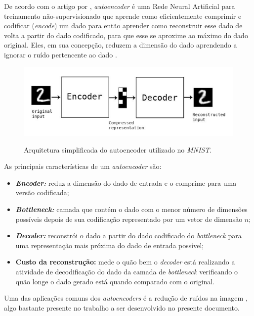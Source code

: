 De acordo com o artigo por , \textit{autoencoder} é uma Rede Neural Artificial para treinamento não-supervisionado que aprende como eficientemente comprimir e codificar (\textit{encode}) um dado para então aprender como reconstruir esse dado de volta a partir do dado codificado, para que esse se aproxime ao máximo do dado original. Eles, em sua concepção, reduzem a dimensão do dado aprendendo a ignorar o ruído pertencente ao dado \cite{intro-to-autoencoders}.

\begin{figure}[H]
  \centering
  \caption{Arquitetura simplificada do autoencoder utilizado no \textit{MNIST}.}
  \includegraphics[scale=0.6]{figuras/mnist-autoencoder.png}
  \label{fig:mnist-autoencoder}
\end{figure}

As principais características de um \textit{autoencoder} são:

\begin{itemize}
  \item \textbf{\textit{Encoder:}} reduz a dimensão do dado de entrada e o comprime para uma versão codificada;
  \item \textbf{\textit{Bottleneck:}} camada que contém o dado com o menor número de dimensões possíveis depois de sua codificação representado por um vetor de dimensão $n$; 
  \item \textbf{\textit{Decoder:}} reconstrói o dado a partir do dado codificado do \textit{bottleneck} para uma representação mais próxima do dado de entrada possível;
  \item \textbf{Custo da reconstrução:} mede o quão bem o \textit{decoder} está realizando a atividade de decodificação do dado da camada de \textit{bottleneck} verificando o quão longe o dado gerado está quando comparado com o original.
\end{itemize}

Uma das aplicações comuns dos \textit{autoencoders} é a redução de ruídos na imagem \cite{intro-to-autoencoders}, algo bastante presente no trabalho a ser desenvolvido no presente documento.

